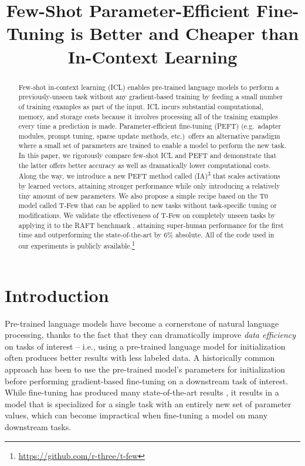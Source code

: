 \title{Few-Shot Parameter-Efficient Fine-Tuning is Better and Cheaper than In-Context Learning}

\begin{abstract}
Few-shot in-context learning (ICL) enables pre-trained language models to perform a previously-unseen task without any gradient-based training by feeding a small number of training examples as part of the input. ICL incurs substantial computational, memory, and storage costs because it involves processing all of the training examples every time a prediction is made. Parameter-efficient fine-tuning (PEFT) (e.g.\ adapter modules, prompt tuning, sparse update methods, etc.)\ offers an alternative paradigm where a small set of parameters are trained to enable a model to perform the new task. In this paper, we rigorously compare few-shot ICL and PEFT and demonstrate that the latter offers better accuracy as well as dramatically lower computational costs. Along the way, we introduce a new PEFT method called {\selectfont (IA)\textsuperscript{3}} that scales activations by learned vectors, attaining stronger performance while only introducing a relatively tiny amount of new parameters. We also propose a simple recipe based on the T0 model \cite{sanh2021multitask} called {\selectfont T-Few} that can be applied to new tasks without task-specific tuning or modifications. We validate the effectiveness of {\selectfont T-Few} on completely unseen tasks by applying it to the RAFT benchmark \cite{alex2021raft}, attaining super-human performance for the first time and outperforming the state-of-the-art by 6\% absolute. All of the code used in our experiments is publicly available.\footnote[1]{\label{note:code} \url{https://github.com/r-three/t-few}}
\end{abstract}

\section{Introduction}

Pre-trained language models have become a cornerstone of natural language processing, thanks to the fact that they can dramatically improve \textit{data efficiency} on tasks of interest -- i.e., using a pre-trained language model for initialization often produces better results with less labeled data. A historically common approach has been to use the pre-trained model's parameters for initialization before performing gradient-based fine-tuning on a downstream task of interest. While fine-tuning has produced many state-of-the-art results \cite{sanh2021multitask}, it results in a model that is specialized for a single task with an entirely new set of parameter values, which can become impractical when fine-tuning a model on many downstream tasks.

